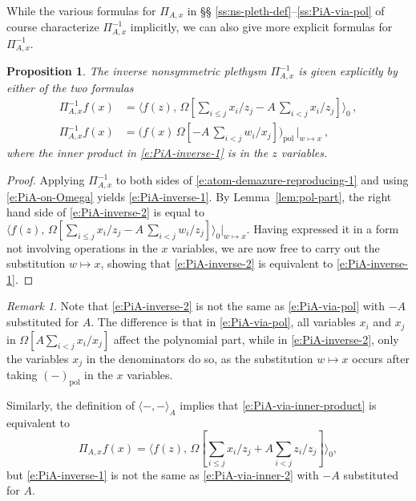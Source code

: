 \documentclass[12pt]{amsart}
\newtheorem{prop}[thm]{Proposition}
\theoremstyle{definition}
\theoremstyle{remark}
\newtheorem{remark}[thm]{Remark}
\DeclareMathOperator{\pol}{pol}
\begin{document}
While the various formulas for $\Pi _{A,x}$ in \S\S
\ref{ss:ns-pleth-def}--\ref{ss:PiA-via-pol} of course characterize
$\Pi _{A,x}^{-1}$ implicitly, we can also give more explicit formulas
for $\Pi _{A,x}^{-1}$.


\begin{prop}\label{prop:PiA-inverse}
The inverse nonsymmetric plethysm $\Pi _{A,x}^{-1}$ is given
explicitly by either of the two formulas
\begin{align}\label{e:PiA-inverse-1}
\Pi _{A,x}^{-1} f(x) & = \langle f(z),\, \Omega [\sum _{i\leq j}
x_{i}/z_{j} - A\, \sum _{i<j} x_{i}/z_{j}] \rangle _{0}\, ,\\
\label{e:PiA-inverse-2}
\Pi _{A,x}^{-1} f(x) & = \bigl( f(x) \, \Omega [-A\, \sum _{i<j}
w_{i}/x_{j}] \bigr)_{\pol }\, |_{w\mapsto x}\ ,
\end{align}
where the inner product in \eqref{e:PiA-inverse-1} is in the $z$ variables.
\end{prop}

\begin{proof}
Applying $\Pi _{A,x}^{-1}$ to both sides of
\eqref{e:atom-demazure-reproducing-1} and using \eqref{e:PiA-on-Omega}
yields \eqref{e:PiA-inverse-1}. By Lemma~\ref{lem:pol-part}, {the right hand side of}
\eqref{e:PiA-inverse-2} is equal to $\langle f(z),\, \Omega [\sum
_{i\leq j} x_{i}/z_{j} -A\, \sum _{i<j} w_{i}/z_{j}] \rangle_{0}
|_{w\mapsto x}$.  Having expressed it in a form not involving
operations in the $x$ variables, we are now free to carry out the
substitution $w\mapsto x$, showing that \eqref{e:PiA-inverse-2} is
equivalent to \eqref{e:PiA-inverse-1}.
\end{proof}

\begin{remark}\label{rem:PiA-inverse}
Note that \eqref{e:PiA-inverse-2} is not the same as
\eqref{e:PiA-via-pol} with $-A$ substituted for $A$.  The difference
is that in \eqref{e:PiA-via-pol}, all variables $x_{i}$ and $x_{j}$ in
$\Omega [A \sum _{i<j} x_{i}/x_{j}]$ affect the polynomial part, while
in \eqref{e:PiA-inverse-2}, only the variables $x_{j}$ in the
denominators do so, as the substitution $w\mapsto x$ occurs after
taking $(-)_{\pol }$ in the $x$ variables.

Similarly, the definition of $\langle -,- \rangle _{A}$
implies that \eqref{e:PiA-via-inner-product} is equivalent to
\begin{equation}\label{e:PiA-via-inner-2}
\Pi _{A,x}f(x) = \langle f(z),\, \Omega [\sum _{i\leq j}x_{i}/z_{j} +
A \sum _{i<j} z_{i}/z_{j}] \rangle _{0},
\end{equation}
but \eqref{e:PiA-inverse-1} is not the same as
\eqref{e:PiA-via-inner-2} with $-A$ substituted for $A$.
\end{remark}
\end{document}
